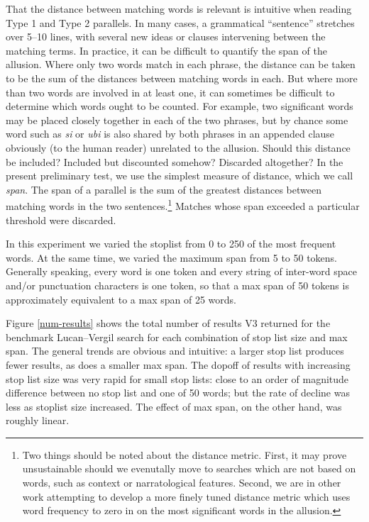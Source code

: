 \documentclass[11pt]{article}
\begin{document}
	That the distance between matching words is relevant is intuitive when reading Type 1 and Type 2 parallels.  In many cases, a grammatical “sentence” stretches over 5–10 lines, with several new ideas or clauses intervening between the matching terms.  In practice, it can be difficult to quantify the span of the allusion.  Where only two words match in each phrase, the distance can be taken to be the sum of the distances between matching words in each.  But where more than two words are involved in at least one, it can sometimes be difficult to determine which words ought to be counted.  For example, two significant words may be placed closely together in each of the two phrases, but by chance some word such as \emph{si} or \emph{ubi} is also shared by both phrases in an appended clause obviously (to the human reader) unrelated to the allusion.  Should this distance be included?  Included but discounted somehow?  Discarded altogether?  In the present preliminary test, we use the simplest measure of distance, which we call \emph{span}.  The span of a parallel is the sum of the greatest distances between matching words in the two sentences.\footnote{Two things should be noted about the distance metric.  First, it may prove unsustainable should we evenutally move to searches which are not based on words, such as context or narratological features.  Second, we are in other work attempting to develop a more finely tuned distance metric which uses word frequency to zero in on the most significant words in the allusion.}  Matches whose span exceeded a particular threshold were discarded.
	
	In this experiment we varied the stoplist from 0 to 250 of the most frequent words.  At the same time, we varied the maximum span from 5 to 50 tokens.  Generally speaking, every word is one token and every string of inter-word space and/or punctuation characters is one token, so that a max span of 50 tokens is approximately equivalent to a max span of 25 words.
	
	Figure \ref{num-results} shows the total number of results V3 returned for the benchmark Lucan–Vergil search for each combination of stop list size and max span.  The general trends are obvious and intuitive: a larger stop list produces fewer results, as does a smaller max span.  The dopoff of results with increasing stop list size was very rapid for small stop lists: close to an order of magnitude difference between no stop list and one of 50 words; but the rate of decline was less as stoplist size increased.  The effect of max span, on the other hand, was roughly linear.
	
\end{document}
